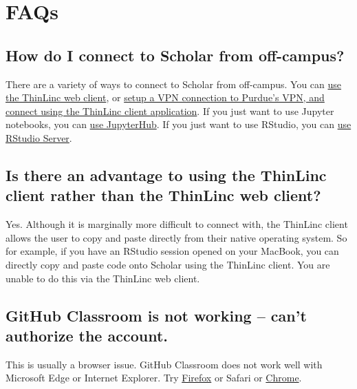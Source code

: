 \documentclass[
]{book}
\begin{document}
\hypertarget{faqs}{%
\chapter{FAQs}\label{faqs}}

\hypertarget{how-do-i-connect-to-scholar-from-off-campus}{%
\section{How do I connect to Scholar from off-campus?}\label{how-do-i-connect-to-scholar-from-off-campus}}

There are a variety of ways to connect to Scholar from off-campus. You can \protect\hyperlink{connecting-with-thinlinc-webclient}{use the ThinLinc web client}, or \protect\hyperlink{connecting-with-thinlinc-client}{setup a VPN connection to Purdue's VPN, and connect using the ThinLinc client application}. If you just want to use Jupyter notebooks, you can \protect\hyperlink{jupyterhub}{use JupyterHub}. If you just want to use RStudio, you can \protect\hyperlink{rstudio-server}{use RStudio Server}.

\hypertarget{is-there-an-advantage-to-using-the-thinlinc-client-rather-than-the-thinlinc-web-client}{%
\section{Is there an advantage to using the ThinLinc client rather than the ThinLinc web client?}\label{is-there-an-advantage-to-using-the-thinlinc-client-rather-than-the-thinlinc-web-client}}

Yes. Although it is marginally more difficult to connect with, the ThinLinc client allows the user to copy and paste directly from their native operating system. So for example, if you have an RStudio session opened on your MacBook, you can directly copy and paste code onto Scholar using the ThinLinc client. You are unable to do this via the ThinLinc web client.

\hypertarget{github-classroom-is-not-working-cant-authorize-the-account.}{%
\section{GitHub Classroom is not working -- can't authorize the account.}\label{github-classroom-is-not-working-cant-authorize-the-account.}}

This is usually a browser issue. GitHub Classroom does not work well with Microsoft Edge or Internet Explorer. Try \href{https://www.mozilla.org/en-US/firefox/new/}{Firefox} or Safari or \href{https://www.google.com/chrome/}{Chrome}.
\end{document}
